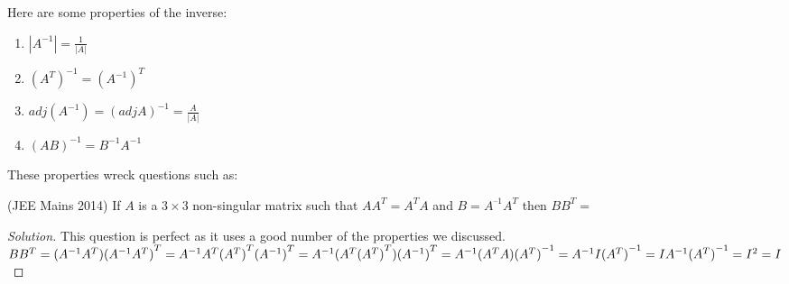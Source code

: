 Here are some properties of the inverse:\\
\begin{theorem}
    \begin{enumerate}
        \item $|A^{-1}|=\frac{1}{|A|}$\\
        \item ${(A^T)}^{-1}={(A^{-1})}^T$
        \item $adj(A^{-1})={(adj A)}^{-1}=\frac{A}{|A|}$\\
        \item $(AB)^{-1}=B^{-1}A^{-1}$
    \end{enumerate}
\end{theorem}
These properties wreck questions such as:\\
\begin{example}
    (JEE Mains 2014) If $A$ is a $3\times3$ non-singular matrix such that $AA^T = A^TA$ and $B = A^{–1} A^T$ then $BB^T=$
\end{example}
\begin{proof}
    [Solution]
    This question is perfect as it uses a good number of the properties we discussed.\\
    $BB^T\\
    = (A^{-1}A^T){(A^{-1}A^T)}^T\\
    = A^{-1}A^T{(A^T)}^T{(A^{-1})}^T\\
    = A^{-1}(A^T{(A^T)}^T){(A^{-1})}^T\\
    = A^{-1}(A^TA){(A^T)}^{-1}\\
    = A^{-1}I{(A^T)}^{-1}\\
    = IA^{-1}{(A^T)}^{-1}\\
    = I^2\\
    = I$
\end{proof}
